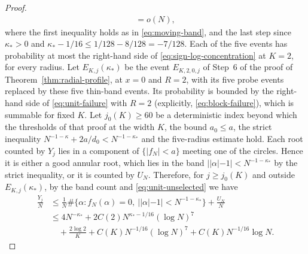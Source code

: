 \begin{proof}
\begin{align*}
 =o(N),
\end{align*}
where the first inequality holds as in \eqref{eq:moving-band}, and the
last step since $\kappa_*>0$ and $\kappa_*-1/16\le1/128-8/128=-7/128$.
Each of the five events has probability at most the right-hand side of
\eqref{eq:sign-log-concentration} at $K=2$, for every radius.
Let $E_{K,j}(\kappa_*)$ be the event $E_{K,2,0,j}$ of Step~6 of the proof
of Theorem~\ref{thm:radial-profile}, at $x=0$ and $R=2$, with its five
probe events replaced by these five thin-band events. Its probability is
bounded by the right-hand side of \eqref{eq:unit-failure} with $R=2$
(explicitly, \eqref{eq:block-failure}), which is summable for fixed
$K$.
Let $j_0(K)\ge60$ be a deterministic index beyond
which the thresholds of that proof at the width $K$,
the bound $a_0\le a$, the strict inequality
$N^{-1-\kappa}+2a/d_0<N^{-1-\kappa_*}$ and the five-radius estimate hold.
Each root counted by $Y_j$ lies in a component of $\{|f_N|<a\}$ meeting
one of the circles. Hence it is either a good annular root, which lies in
the band $||\alpha|-1|<N^{-1-\kappa_*}$ by the strict inequality, or it
is counted by $U_N$. Therefore, for $j\ge j_0(K)$ and outside
$E_{K,j}(\kappa_*)$, by the band count and \eqref{eq:unit-unselected} we
have
\begin{align*}
 \frac{Y_j}N
 &\le\frac1N\#\{\alpha:f_N(\alpha)=0,\ ||\alpha|-1|<N^{-1-\kappa_*}\}
      +\frac{U_N}N\\
 &\le4N^{-\kappa_*}+2C(2)N^{\kappa_*-1/16}(\log N)^7\\
 &\quad+\frac{2\log2}{K}+C(K)N^{-1/16}(\log N)^7+C(K)N^{-1/16}\log N.
\end{align*}


\end{proof}
